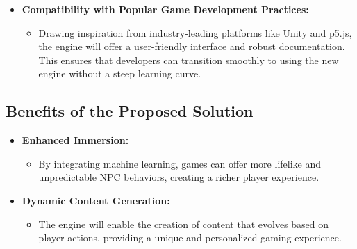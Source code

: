 \begin{itemize}
    \item \textbf{Compatibility with Popular Game Development Practices:}
    \begin{itemize}
        \item Drawing inspiration from industry-leading platforms like Unity and p5.js, the engine will offer a user-friendly interface and robust documentation. This ensures that developers can transition smoothly to using the new engine without a steep learning curve.
    \end{itemize}
\end{itemize}


\subsection*{Benefits of the Proposed Solution}

\begin{itemize}
    \item \textbf{Enhanced Immersion:}
    \begin{itemize}
        \item By integrating machine learning, games can offer more lifelike and unpredictable NPC behaviors, creating a richer player experience.
    \end{itemize}
    
    \item \textbf{Dynamic Content Generation:}
    \begin{itemize}
        \item The engine will enable the creation of content that evolves based on player actions, providing a unique and personalized gaming experience.
    \end{itemize}
    
\end{itemize}



